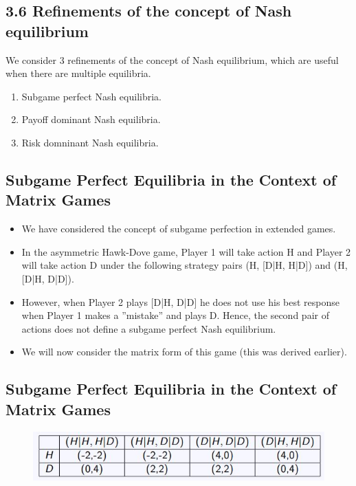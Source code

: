\documentclass[]{report}
\begin{document}
\subsection{3.6 Refinements of the concept of Nash equilibrium}
We consider 3 refinements of the concept of Nash equilibrium,
which are useful when there are multiple equilibria.
\begin{enumerate}
	\item Subgame perfect Nash equilibria.
	\item Payoff dominant Nash equilibria.
	\item Risk domninant Nash equilibria.
\end{enumerate}

\subsection{Subgame Perfect Equilibria in the Context of Matrix Games}
\begin{itemize}
	\item We have considered the concept of subgame perfection in extended
	games.
	\item In the asymmetric Hawk-Dove game, Player 1 will take action H
	and Player 2 will take action D under the following strategy pairs
	(H, [D|H, H|D]) and (H, [D|H, D|D]).
	\item 	However, when Player 2 plays [D|H, D|D] he does not use his best
	response when Player 1 makes a ”mistake” and plays D. Hence,
	the second pair of actions does not define a subgame perfect Nash
	equilibrium.
	\item 	We will now consider the matrix form of this game (this was
	derived earlier).
\end{itemize}

\subsection{Subgame Perfect Equilibria in the Context of Matrix Games}

\begin{figure}[h!]
\centering
\includegraphics[width=0.7\linewidth]{images/DR6-Slide34}
\caption{}
\label{fig:DR6-Slide34}
\end{figure}
\end{document}

